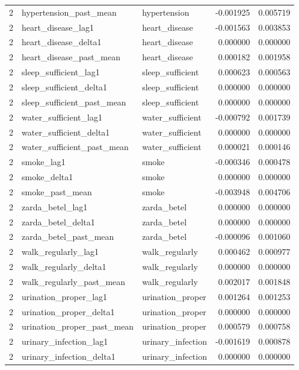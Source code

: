 \begin{longtable}{rllrr}
2 & hypertension\_past\_mean & hypertension & -0.001925 & 0.005719 \\
2 & heart\_disease\_lag1 & heart\_disease & -0.001563 & 0.003853 \\
2 & heart\_disease\_delta1 & heart\_disease & 0.000000 & 0.000000 \\
2 & heart\_disease\_past\_mean & heart\_disease & 0.000182 & 0.001958 \\
2 & sleep\_sufficient\_lag1 & sleep\_sufficient & 0.000623 & 0.000563 \\
2 & sleep\_sufficient\_delta1 & sleep\_sufficient & 0.000000 & 0.000000 \\
2 & sleep\_sufficient\_past\_mean & sleep\_sufficient & 0.000000 & 0.000000 \\
2 & water\_sufficient\_lag1 & water\_sufficient & -0.000792 & 0.001739 \\
2 & water\_sufficient\_delta1 & water\_sufficient & 0.000000 & 0.000000 \\
2 & water\_sufficient\_past\_mean & water\_sufficient & 0.000021 & 0.000146 \\
2 & smoke\_lag1 & smoke & -0.000346 & 0.000478 \\
2 & smoke\_delta1 & smoke & 0.000000 & 0.000000 \\
2 & smoke\_past\_mean & smoke & -0.003948 & 0.004706 \\
2 & zarda\_betel\_lag1 & zarda\_betel & 0.000000 & 0.000000 \\
2 & zarda\_betel\_delta1 & zarda\_betel & 0.000000 & 0.000000 \\
2 & zarda\_betel\_past\_mean & zarda\_betel & -0.000096 & 0.001060 \\
2 & walk\_regularly\_lag1 & walk\_regularly & 0.000462 & 0.000977 \\
2 & walk\_regularly\_delta1 & walk\_regularly & 0.000000 & 0.000000 \\
2 & walk\_regularly\_past\_mean & walk\_regularly & 0.002017 & 0.001848 \\
2 & urination\_proper\_lag1 & urination\_proper & 0.001264 & 0.001253 \\
2 & urination\_proper\_delta1 & urination\_proper & 0.000000 & 0.000000 \\
2 & urination\_proper\_past\_mean & urination\_proper & 0.000579 & 0.000758 \\
2 & urinary\_infection\_lag1 & urinary\_infection & -0.001619 & 0.000878 \\
2 & urinary\_infection\_delta1 & urinary\_infection & 0.000000 & 0.000000 \\

\end{longtable}
